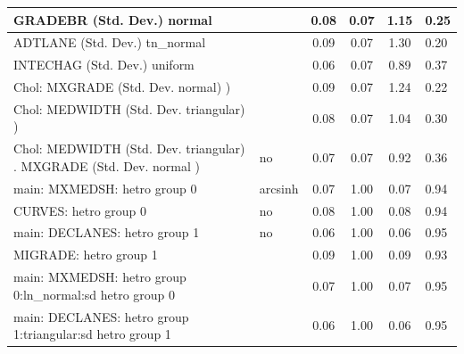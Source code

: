 \begin{table}
\begin{center}
\begin{tabular}{|l|l|c|c|c|l|}
			\hline
			GRADEBR (Std. Dev.) normal &  & 0.08 & 0.07 & 1.15 & 0.25 \\
			\hline
			ADTLANE (Std. Dev.) tn_normal &  & 0.09 & 0.07 & 1.30 & 0.20 \\
			\hline
			INTECHAG (Std. Dev.) uniform &  & 0.06 & 0.07 & 0.89 & 0.37 \\
			\hline
			 Chol: MXGRADE (Std. Dev. normal) ) &  & 0.09 & 0.07 & 1.24 & 0.22 \\
			\hline
			 Chol: MEDWIDTH (Std. Dev. triangular) ) &  & 0.08 & 0.07 & 1.04 & 0.30 \\
			\hline
			 Chol: MEDWIDTH (Std. Dev. triangular) . MXGRADE (Std. Dev.   normal ) & no & 0.07 & 0.07 & 0.92 & 0.36 \\
			\hline
			main: MXMEDSH: hetro group 0 & arcsinh & 0.07 & 1.00 & 0.07 & 0.94 \\
			\hline
			CURVES: hetro group 0 & no & 0.08 & 1.00 & 0.08 & 0.94 \\
			\hline
			main: DECLANES: hetro group 1 & no & 0.06 & 1.00 & 0.06 & 0.95 \\
			\hline
			MIGRADE: hetro group 1 &  & 0.09 & 1.00 & 0.09 & 0.93 \\
			\hline
			main: MXMEDSH: hetro group 0:ln_normal:sd  hetro group 0 &  & 0.07 & 1.00 & 0.07 & 0.95 \\
			\hline
			main: DECLANES: hetro group 1:triangular:sd  hetro group 1 &  & 0.06 & 1.00 & 0.06 & 0.95 \\
			\hline
		\end{tabular}
	\end{center}
\end{table}
